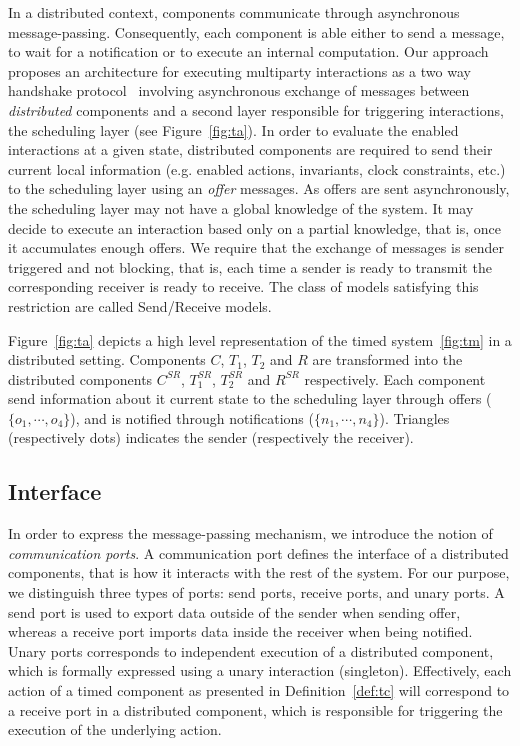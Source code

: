 In a distributed context, components communicate through asynchronous message-passing.
Consequently, each component is able either to send a message, to wait for a notification
or to execute an internal computation. Our approach proposes an architecture for executing
multiparty interactions as a two way handshake protocol~\cite{} involving asynchronous exchange 
of messages between \emph{distributed} components and a second layer responsible for 
triggering interactions, the scheduling layer (see Figure~\ref{fig:ta}). 
In order to evaluate the enabled interactions at a given state, distributed components are 
required to send their current local information (e.g. enabled actions, invariants, 
clock constraints, etc.) to the scheduling layer using an \emph{offer} messages. 
As offers are sent asynchronously,  
the scheduling layer may not have a global knowledge of the system. It may decide to execute
an interaction based only on a partial knowledge, that is, once it accumulates enough offers.
We require that the exchange of messages is sender triggered and not blocking, that is,
each time a sender is ready to transmit the corresponding receiver is ready to receive.
The class of models satisfying this restriction are called Send/Receive models.

\begin{example}
  Figure~\ref{fig:ta} depicts a high level representation of the timed system~\ref{fig:tm} in a 
  distributed setting. Components $C$, $T_1$, $T_2$ and $R$ are transformed into the distributed
  components $C^{SR}$, $T_1^{SR}$, $T_2^{SR}$ and $R^{SR}$ respectively. Each component send 
  information about it current state to the scheduling layer through offers  
  ($\{o_1,\cdots,o_4\}$), and is notified through notifications ($\{n_1,\cdots,n_4\}$).
  Triangles (respectively dots) indicates the sender (respectively the receiver). 
\end{example}


\subsection{Interface}
In order to express the message-passing mechanism, we introduce the notion of 
\emph{communication ports}. A communication port defines the interface of a distributed 
components, that is how it interacts with the rest of the system. For our purpose, we distinguish
three types of ports: send ports, receive ports, and unary ports.
A send port is used to export data outside of the sender when sending offer, whereas
a receive port imports data inside the receiver  
when being notified. Unary ports corresponds to independent execution of a distributed 
component, which is formally expressed using a unary interaction (singleton). 
Effectively, each action of a timed component as presented in Definition~\ref{def:tc} 
will correspond to a receive port in a distributed component, which is responsible for triggering
the execution of the underlying action.

